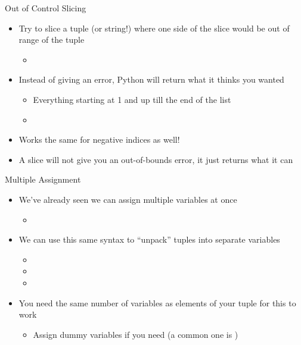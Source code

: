 \documentclass[pdf, aspectratio=169, 12pt]{beamer}
\begin{document}
\begin{frame}{Out of Control Slicing}
	\begin{itemize}
		\item Try to slice a tuple (or string!) where one side of the slice would be out of range of the tuple
			\begin{itemize}
				\item {}
			\end{itemize}
		\item Instead of giving an error, Python will return what it thinks you wanted
			\begin{itemize}
				\item Everything starting at 1 and up till the end of the list
				\item {}
			\end{itemize}
		\item Works the same for negative indices as well!
		\item A slice will not give you an out-of-bounds error, it just returns what it can
	\end{itemize}
\end{frame}

\begin{frame}{Multiple Assignment}
	\begin{itemize}
		\item We've already seen we can assign multiple variables at once
			\begin{itemize}
				\item {}
			\end{itemize}
		\item We can use this same syntax to ``unpack'' tuples into separate variables
			\begin{itemize}
				\item {}
				\item {}
				\item {}
			\end{itemize}
		\item You need the same number of variables as elements of your tuple for this to work
			\begin{itemize}
				\item Assign dummy variables if you need (a common one is \pyi{_})
			\end{itemize}
	\end{itemize}
\end{frame}
\end{document}
